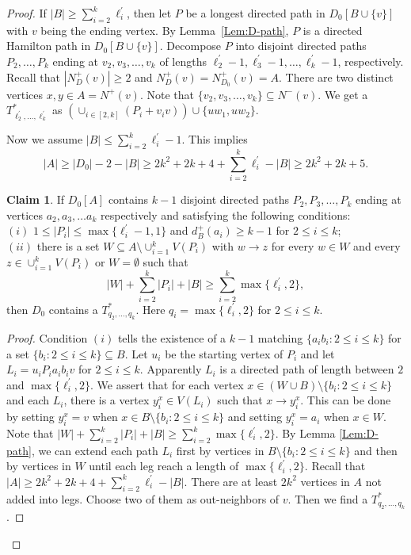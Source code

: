 \documentclass[11pt,a4paper]{article}
\theoremstyle{definition}
\newtheorem{claim}{Claim}
\begin{document}
\begin{proof}
If $|B|\geq \sum_{i=2}^k \ell^\prime_i$,  then let $P$ be a longest directed path in $D_0[B\cup\{v\}]$ with $v$ being the ending vertex. By Lemma~\ref{Lem:D-path}, $P$ is a directed Hamilton path in $D_0[B\cup\{v\}]$.  Decompose $P$ into disjoint directed paths $P_2,\ldots,P_k$ ending at $v_2,v_3,\ldots,v_k$ of lengths  $\ell^{\prime}  _2-1,\ell^{\prime}  _3-1, \ldots, \ell^{\prime}  _k -1$, respectively. Recall that $|N^+_D(v)|\geq 2$ and $N^+_D(v)=N^+_{D_0}(v)=A$. There are two distinct vertices $x,y \in A=N^+(v)$.  Note that $\{v_2,v_3,\ldots,v_k\}\subseteq N^-(v)$. We get a $T^*_{ \ell^{\prime}  _2, \ldots, \ell^{\prime}  _k}$ as $ (\cup_{i\in[2,k]}(P_i+v_iv))\cup \{uw_1, uw_2\}$.

Now we assume $|B|\leq \sum_{i=2}^k \ell^\prime_i-1$. This implies
\begin{equation}\label{bound:A}
    |A|\geq |D_0|-2-|B|\geq 2k^2+2k+4+\sum_{i=2}^k \ell^\prime_i-|B|\geq 2k^2+2k+5.
\end{equation}
\begin{claim}\label{cl:merge}
If $D_0[A]$ contains $k-1$ disjoint directed paths $P_2,P_3,\ldots,P_k$ ending at vertices $a_2,a_3,\ldots a_k$ respectively and satisfying the following conditions:  \\
$(i)$ $1\leq |P_i|\leq \max\{\ell_i^\prime-1,1\}$ and $d^+_B(a_i)\geq k-1$ for $2\leq i\leq k$;\\
$(ii)$ there is a set $W\subseteq A\setminus \cup_{i=1}^k V(P_i)$ with $w\rightarrow z$ for every $w\in W$ and every $z\in \cup_{i=1}^k V(P_i)$ or $W=\emptyset$ such that
$$
|W|+\sum_{i=2}^k|P_i|+|B|\geq \sum_{i=2}^k \max\{\ell^\prime_i,2\},
$$
then $D_0$ contains a $T^*_{ q_2, \ldots, q_k}$. Here $q_i=\max\{\ell^\prime_i,2\}$ for $2\leq i\leq k$.
\end{claim}
\begin{proof} Condition $(i)$ tells the existence of a $k-1$ matching $\{a_ib_i: 2\leq i\leq k\}$ for a set $\{b_i:2\leq i\leq k\}\subseteq B$. Let $u_i$ be the starting vertex of $P_i$ and let $L_i=u_iP_ia_ib_iv$ for $2\leq i\leq k$. Apparently $L_i$ is a directed path of length between $2$ and $\max\{\ell^\prime_i,2\}$. We assert that for each vertex $x\in (W\cup B)\setminus\{b_i: 2\leq i\leq k\}$ and each $L_i$, there is a vertex $y^x_i\in V(L_i)$ such that $x\rightarrow y^x_i$. This can be done by setting $y^x_i=v$ when $x\in B\setminus\{b_i: 2\leq i\leq k\}$ and setting $y^x_i=a_i$ when $x\in W$. Note that $|W|+\sum_{i=2}^k|P_i|+|B|\geq \sum_{i=2}^k \max\{\ell^\prime_i,2\}.$
By Lemma \ref{Lem:D-path}, we can extend each path $L_i$ first by vertices in $B\setminus\{b_i: 2\leq i\leq k\}$ and then by vertices in $W$ until each leg reach a length of $\max\{\ell^\prime_i,2\}$. Recall that $|A|\geq 2k^2+2k+4+\sum_{i=2}^k \ell^\prime_i-|B|$. There are at least $2k^2$ vertices in $A$ not added into legs. Choose two of them as out-neighbors of $v$. Then we find a $T^*_{ q_2, \ldots, q_k}$.

\end{proof}
\end{proof}
\end{document}
